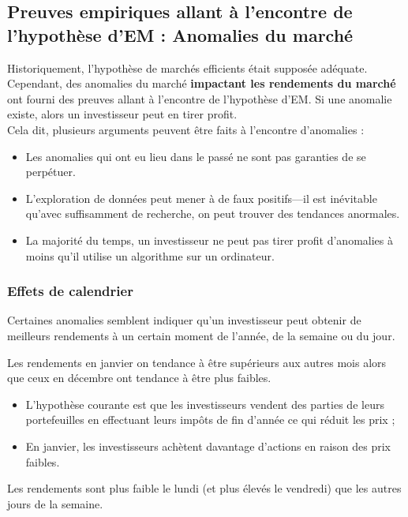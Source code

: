 \documentclass[10pt, french]{article}
\begin{document}
\begin{multicols*}{2}
\columnbreak
\subsection{Preuves empiriques allant à l'encontre de l'hypothèse d'EM : Anomalies du marché}
Historiquement, l'hypothèse de marchés efficients était supposée adéquate. Cependant, des anomalies du marché \textbf{impactant les rendements du marché} ont fourni des preuves allant à l'encontre de l'hypothèse d'EM. Si une anomalie existe, alors un investisseur peut en tirer profit.\\

Cela dit, plusieurs arguments peuvent être faits à l'encontre d'anomalies :
\begin{itemize}
	\item	Les anomalies qui ont eu lieu dans le passé ne sont pas garanties de se perpétuer.
	\item	L'exploration de données peut mener à de faux positifs---il est inévitable qu'avec suffisamment de recherche, on peut trouver des tendances anormales.
	\item	La majorité du temps, un investisseur ne peut pas tirer profit d'anomalies à moins qu'il utilise un algorithme sur un ordinateur.
\end{itemize}

\subsubsection{Effets de calendrier}
Certaines anomalies semblent indiquer qu'un investisseur peut obtenir de meilleurs rendements à un certain moment de l'année, de la semaine ou du jour.

\begin{definitionNOHFILLprop}
Les rendements en janvier on tendance à être supérieurs aux autres mois alors que ceux en décembre ont tendance à être plus faibles.
\begin{itemize}
	\item	L'hypothèse courante est que les investisseurs vendent des parties de leurs portefeuilles en effectuant leurs impôts de fin d'année ce qui réduit les prix ;
	\item	En janvier, les investisseurs achètent davantage d'actions en raison des prix faibles.
\end{itemize}
\end{definitionNOHFILLprop}

\begin{definitionNOHFILLprop}
Les rendements sont plus faible le lundi (et plus élevés le vendredi) que les autres jours de la semaine.


\end{definitionNOHFILLprop}
\end{multicols*}
\end{document}

